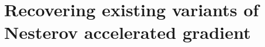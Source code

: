 \documentclass[12pt]{article}
\begin{document}


\section{Recovering existing variants of Nesterov accelerated gradient}\label{sec:recovery}
    
\end{document}
